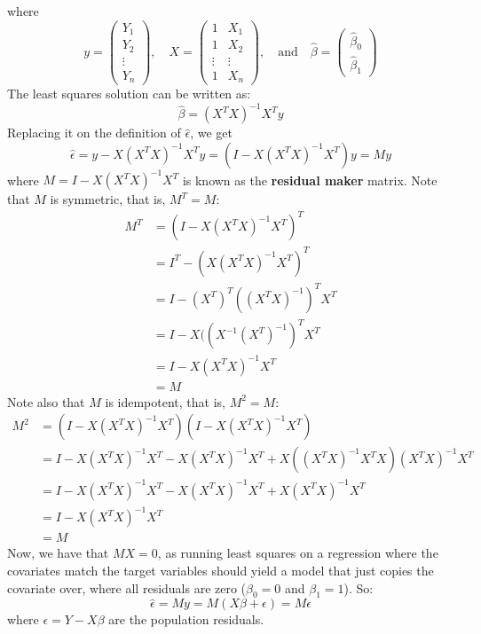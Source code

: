 where \[
y = \begin{pmatrix}
Y_{1} \\
Y_{2} \\
\vdots \\
Y_{n}
\end{pmatrix}
, \quad
X = \begin{pmatrix}
1 & X_{1} \\
1 & X_{2} \\
\vdots & \vdots \\
1 & X_{n}
\end{pmatrix},
\quad \text{and} \quad
\hat{\beta} = \begin{pmatrix}
\hat{\beta}_{0} \\
\hat{\beta}_{1}
\end{pmatrix}
\]
The least squares solution can be written as:
\[
\hat{\beta} = (X^T X)^{-1} X^T y
\]
Replacing it on the definition of \(\hat{\epsilon}\), we get
\[
\hat{\epsilon} = y - X (X^T X)^{-1} X^T y = (I - X (X^T X)^{-1} X^T) y = M y
\]
where \(M = I - X (X^T X)^{-1} X^T\) is known as the \textbf{residual
maker} matrix.
Note that \(M\) is symmetric, that is, \(M^T = M\):
\begin{align*}
M^T &= (I - X (X^T X)^{-1} X^T)^T  \\
&= I^T - (X (X^T X)^{-1} X^T)^T \\
&= I - (X^T)^T ((X^T X)^{-1})^T X^T \\
&= I - X ((X^{-1}(X^T)^{-1})^T X^T \\
&= I -  X (X^T X)^{-1} X^T \\
&= M
\end{align*}
Note also that \(M\) is idempotent, that is, \(M^{2} = M\):
\begin{align*}
M^{2} &= (I - X (X^T X)^{-1} X^T) (I - X (X^T X)^{-1} X^T) \\
&= I - X (X^T X)^{-1} X^T - X (X^T X)^{-1} X^T + X \left( (X^T X)^{-1} X^T X \right) (X^T X)^{-1} X^T \\
&= I - X (X^T X)^{-1} X^T - X (X^T X)^{-1} X^T + X (X^T X)^{-1} X^T \\
&= I - X (X^T X)^{-1} X^T \\
&= M
\end{align*}
Now, we have that \(MX = 0\), as running least squares on a regression
where the covariates match the target variables should yield a model
that just copies the covariate over, where all residuals are zero
(\(\beta_{0} = 0\) and \(\beta_{1} = 1\)). So:
\[
\hat{\epsilon} = M y = M( X \beta + \epsilon) = M\epsilon
\]
where \(\epsilon = Y - X\beta\) are the population residuals.
